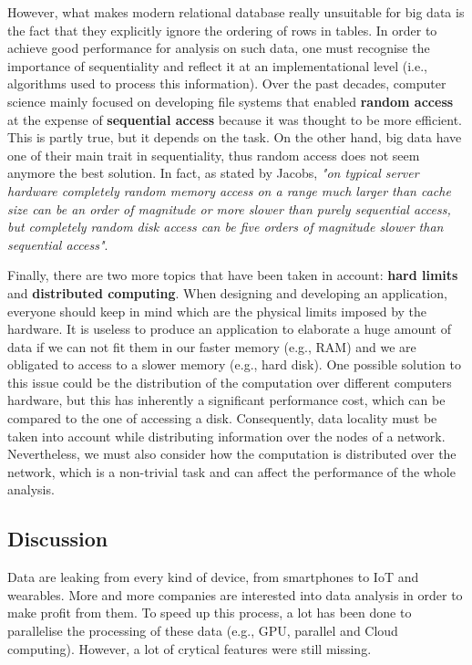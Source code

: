 \documentclass[a4paper]{IEEEtran}
\begin{document}
However, what makes modern relational database really unsuitable for big data is the fact that they explicitly ignore the ordering of rows in tables. In order to achieve good performance for analysis on such data, one must recognise the importance of sequentiality and reflect it at an implementational level (i.e., algorithms used to process this information). 
Over the past decades, computer science mainly focused on developing file systems that enabled \textbf{random access} at the expense of \textbf{sequential access} because it was thought to be more efficient. This is partly true, but it depends on the task. On the other hand, big data have one of their main trait in sequentiality, thus random access does not seem anymore the best solution. In fact, as stated by Jacobs, \textit{"on typical server hardware completely random memory access on a range much larger than cache size can be an order of magnitude or more slower than purely sequential access, but completely random disk access can be five orders of magnitude slower than sequential access"}.

Finally, there are two more topics that have been taken in account: \textbf{hard limits} and \textbf{distributed computing}. When designing and developing an application, everyone should keep in mind which are the physical limits imposed by the hardware. It is useless to produce an application to elaborate a huge amount of data if we can not fit them in our faster memory (e.g., RAM) and we are obligated to access to a slower memory (e.g., hard disk). One possible solution to this issue could be the distribution of the computation over different computers hardware, but this has inherently a significant performance cost, which can be compared to the one of accessing a disk. Consequently, data locality must be taken into account while distributing information over the nodes of a network. Nevertheless, we must also consider how the computation is distributed over the network, which is a non-trivial task and can affect the performance of the whole analysis.

\subsection{Discussion}

Data are leaking from every kind of device, from smartphones to IoT and wearables. More and more companies are interested into data analysis in order to make profit from them. To speed up this process, a lot has been done to parallelise the processing of these data (e.g., GPU, parallel and Cloud computing). However, a lot of crytical features were still missing.
\end{document}
